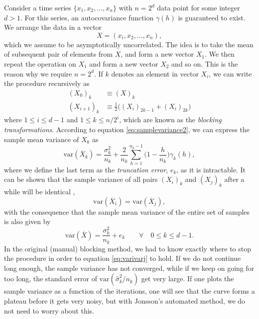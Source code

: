 Consider a time series $\{x_1, x_2, \hdots, x_n\}$ with $n=2^d$ data point for some integer $d>1$. For this series, an autocovariance function $\gamma(h)$ is guaranteed to exist. We arrange the data in a vector
\begin{equation}
X=(x_i,x_2,\hdots,x_n),
\end{equation}
which we assume to be asymptotically uncorrelated. The idea is to take the mean of subsequent pair of elements from $X$, and form a new vector $X_1$. We then repeat the operation on $X_1$ and form a new vector $X_2$ and so on. This is the reason why we require $n=2^d$. If $k$ denotes an element in vector $X_i$, we can write the procedure recursively as
\begin{equation}
\begin{aligned}
(X_0)_k&\equiv(X)_k\\
(X_{i+1})_k&\equiv\frac{1}{2}\Big((X_i)_{2k-1}+(X_i)_{2k}\Big)
\end{aligned}
\end{equation}
where $1\leq i\leq d-1$ and $1\leq k\leq n/2^i$, which are known as the \textit{blocking transformations}. According to equation \eqref{eq:samplevariance2}, we can express the sample mean variance of $X_k$ as
\begin{equation}
\text{var}(\overline{X}_k)=\frac{\sigma_k^2}{n_k}+\frac{2}{n_k}\sum_{h=1}^{n_k-1}\Big(1-\frac{h}{n_k}\Big)\gamma_k(h),
\end{equation}
where we define the last term as the \textit{truncation error}, $e_k$, as it is intractable. It can be shown that the sample variance of all pairs $(X_i)_k$ and $(X_j)_k$ after a while will be identical \cite{flyvbjerg_error_1989},
\begin{equation}
\text{var}(\overline{X}_i)=\text{var}(\overline{X}_j),
\label{eq:varivarj}
\end{equation}
with the consequence that the sample mean variance of the entire set of samples is also given by
\begin{equation}
\text{var}(\overline{X})=\frac{\sigma_k^2}{n_k}+e_k\quad\quad\forall\quad 0\leq k\leq d-1.
\end{equation}
In the original (manual) blocking method, we had to know exactly where to stop the procedure in order to equation \eqref{eq:varivarj} to hold. If we do not continue long enough, the sample variance has not converged, while if we keep on going for too long, the standard error of $\text{var}(\hat{\sigma}_k^2/n_k)$ get very large. If one plots the sample variance as a function of the iterations, one will see that the curve forms a plateau before it gets very noisy, but with Jonsson's automated method, we do not need to worry about this. 

